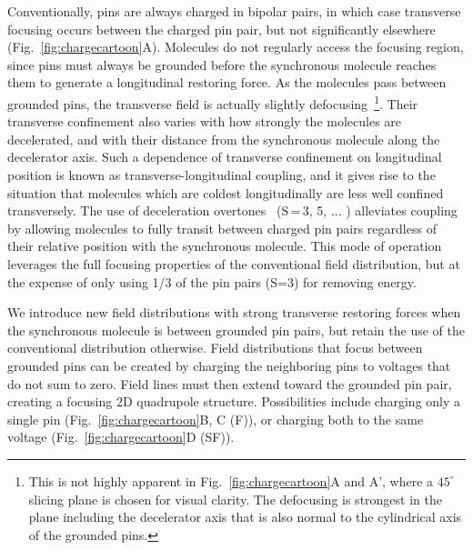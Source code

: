 \documentclass[%
 reprint,
 amsmath,amssymb,
 aps,
prl,
]{revtex4-1}
\begin{document}
Conventionally, pins are always charged in bipolar pairs, in which case transverse focusing occurs between the charged pin pair, but not significantly elsewhere (Fig.~\ref{fig:chargecartoon}A).
Molecules do not regularly access the focusing region, since pins must always be grounded before the synchronous molecule reaches them to generate a longitudinal restoring force.
As the molecules pass between grounded pins, the transverse field is actually slightly defocusing~\footnote{This is not highly apparent in Fig.~\ref{fig:chargecartoon}A and A', where a $45^\circ$ slicing plane is chosen for visual clarity. The defocusing is strongest in the plane including the decelerator axis that is also normal to the cylindrical axis of the grounded pins.}.  Their transverse confinement also varies with how strongly the molecules are decelerated, and with their distance from the synchronous molecule along the decelerator axis. Such a dependence of transverse confinement on longitudinal position is known as transverse-longitudinal coupling, and it gives rise to the situation that molecules which are coldest longitudinally are less well confined transversely.
The use of deceleration overtones~\cite{VanDeMeerakker2005a} (S\,=\,3, 5, ... ) alleviates	coupling by allowing molecules to fully transit between charged pin pairs regardless of their relative position with the synchronous molecule. This mode of operation leverages the full focusing properties of the conventional field distribution, but at the expense of only using 1/3 of the pin pairs (S=3) for removing energy.

We introduce new field distributions with strong transverse restoring forces when the synchronous molecule is between grounded pin pairs, but retain the use of the conventional distribution otherwise. Field distributions that focus between grounded pins can be created by charging the neighboring pins to voltages that do not sum to zero.
Field lines must then extend toward the grounded pin pair, creating a focusing 2D quadrupole structure.
Possibilities include charging only a single pin (Fig.~\ref{fig:chargecartoon}B, C (F)), or charging both to the same voltage (Fig.~\ref{fig:chargecartoon}D (SF)).
\end{document}
